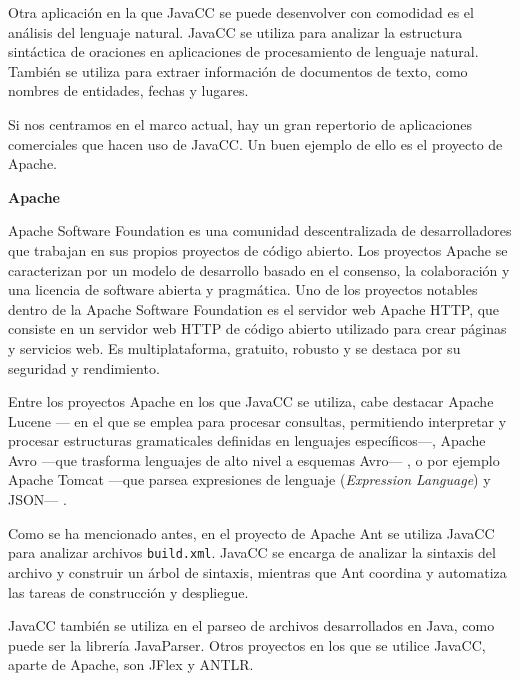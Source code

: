 Otra aplicación en la que JavaCC se puede desenvolver con comodidad es el análisis del lenguaje natural. JavaCC se utiliza para analizar la estructura sintáctica de oraciones en aplicaciones de procesamiento de lenguaje natural\cite{languageprocessing}. También se utiliza para extraer información de documentos de texto, como nombres de entidades, fechas y lugares.

Si nos centramos en el marco actual, hay un gran repertorio de aplicaciones comerciales que hacen uso de JavaCC. Un buen ejemplo de ello es el proyecto de Apache.

\phantom{text}

\noindent \textbf{Apache}

\phantom{text}

\noindent Apache Software Foundation es una comunidad descentralizada de desarrolladores que trabajan en sus propios proyectos de código abierto. Los proyectos Apache se caracterizan por un modelo de desarrollo basado en el consenso, la colaboración y una licencia de software abierta y pragmática\cite{apachepaginaoficial}. Uno de los proyectos notables dentro de la Apache Software Foundation es el servidor web Apache HTTP, que consiste en un servidor web HTTP de código abierto utilizado para crear páginas y servicios web. Es multiplataforma, gratuito, robusto y se destaca por su seguridad y rendimiento\cite{apachehttp}.

Entre los proyectos Apache en los que JavaCC se utiliza, cabe destacar Apache Lucene --- en el que se emplea para procesar consultas, permitiendo interpretar y procesar estructuras gramaticales definidas en lenguajes específicos---, Apache Avro ---que trasforma lenguajes de alto nivel a esquemas Avro--- , o por ejemplo Apache Tomcat ---que parsea expresiones de lenguaje (\textit{Expression Language})\cite{expressionlanguage} y JSON--- \cite{javaccgithub}.

Como se ha mencionado antes, en el proyecto de Apache Ant se utiliza JavaCC para analizar archivos \lstinline|build.xml|. JavaCC se encarga de analizar la sintaxis del archivo y construir un árbol de sintaxis, mientras que Ant coordina y automatiza las tareas de construcción y despliegue.

JavaCC también se utiliza en el parseo de archivos desarrollados en Java, como puede ser la librería JavaParser\cite{javaparser}. Otros proyectos en los que se utilice JavaCC, aparte de Apache, son JFlex y ANTLR.

\phantom{text}

